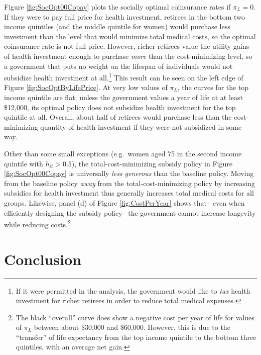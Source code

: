 \documentclass[12pt,pdftex,letterpaper]{article}
\newcommand{\Health}{h}
\begin{document}
Figure \ref{fig:SocOpt00Copay} plots the socially optimal coinsurance rates if $\pi_L=0$.  If they were to pay full price for health investment, retirees in the bottom two income quintiles (and the middle quintile for women) would purchase less investment than the level that would minimize total medical costs, so the optimal coinsurance rate is not full price.  However, richer retirees value the utility gains of health investment enough to purchase \textit{more} than the cost-minimizing level, so a government that puts no weight on the lifespan of individuals would not subsidize health investment at all.\footnote{If it were permitted in the analysis, the government would like to \textit{tax} health investment for richer retirees in order to reduce total medical expenses.}  This result can be seen on the left edge of Figure \ref{fig:SocOptByLifePrice}.  At very low values of $\pi_L$, the curves for the top income quintile are flat; unless the government values a year of life at at least \$12,000, its optimal policy does not subsidize health investment for the top quintile at all.  Overall, about half of retirees would purchase less than the cost-minimizing quantity of health investment if they were not subsidized in some way.

Other than some small exceptions (e.g.\ women aged 75 in the second income quintile with $\Health_{it} > 0.5$), the total-cost-minimizing subsidy policy in Figure \ref{fig:SocOpt00Copay} is universally \textit{less generous} than the baseline policy.  Moving from the baseline policy \textit{away} from the total-cost-minimizing policy by increasing subsidies for health investment thus generally increases total medical costs for all groups.  Likewise, panel (d) of Figure \ref{fig:CostPerYear} shows that-- even when efficiently designing the subsidy policy-- the government cannot increase longevity while reducing costs.\footnote{The black ``overall'' curve does show a negative cost per year of life for values of $\pi_L$ between about \$30,000 and \$60,000.  However, this is due to the ``transfer'' of life expectancy from the top income quintile to the bottom three quintiles, with an average net gain.}


\section{Conclusion}
\label{sec:Conc}
\end{document}
